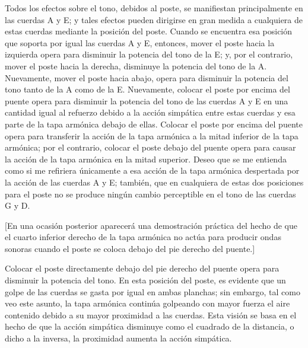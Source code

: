 \documentclass[12pt]{book}
\begin{document}
Todos los efectos sobre el tono, debidos al poste, se manifiestan principalmente en las cuerdas A y E; y tales efectos pueden dirigirse en gran medida a cualquiera de estas cuerdas mediante la posición del poste. Cuando se encuentra esa posición que soporta por igual las cuerdas A y E, entonces, mover el poste hacia la izquierda opera para disminuir la potencia del tono de la E; y, por el contrario, mover el poste hacia la derecha, disminuye la potencia del tono de la A. Nuevamente, mover el poste hacia abajo, opera para disminuir la potencia del tono tanto de la A como de la E. Nuevamente, colocar el poste por encima del puente opera para disminuir la potencia del tono de las cuerdas A y E en una cantidad igual al refuerzo debido a la acción simpática entre estas cuerdas y esa parte de la tapa armónica debajo de ellas. Colocar el poste por encima del puente opera para transferir la acción de la tapa armónica a la mitad inferior de la tapa armónica; por el contrario, colocar el poste debajo del puente opera para causar la acción de la tapa armónica en la mitad superior. Deseo que se me entienda como si me refiriera únicamente a esa acción de la tapa armónica despertada por la acción de las cuerdas A y E; también, que en cualquiera de estas dos posiciones para el poste no se produce ningún cambio perceptible en el tono de las cuerdas G y D.

[En una ocasión posterior aparecerá una demostración práctica del hecho de que el cuarto inferior derecho de la tapa armónica no actúa para producir ondas sonoras cuando el poste se coloca debajo del pie derecho del puente.]

Colocar el poste directamente debajo del pie derecho del puente opera para disminuir la potencia del tono. En esta posición del poste, es evidente que un golpe de las cuerdas se gasta por igual en ambas planchas; sin embargo, tal como veo este asunto, la tapa armónica continúa golpeando con mayor fuerza el aire contenido debido a su mayor proximidad a las cuerdas. Esta visión se basa en el hecho de que la acción simpática disminuye como el cuadrado de la distancia, o dicho a la inversa, la proximidad aumenta la acción simpática.
\end{document}
